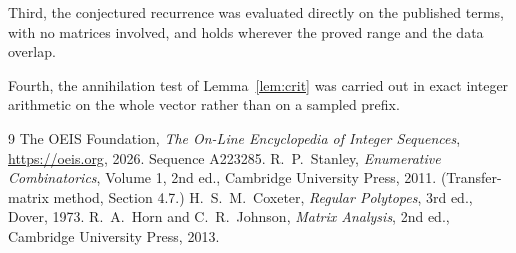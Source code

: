 \documentclass[11pt,a4paper]{article}
\theoremstyle{plain}
\theoremstyle{definition}
\begin{document}
Third, the conjectured recurrence was evaluated directly on the published terms, with no
matrices involved, and holds wherever the proved range and the data overlap.

Fourth, the annihilation test of Lemma~\ref{lem:crit} was carried out in exact integer
arithmetic on the whole vector rather than on a sampled prefix.

\begin{thebibliography}{9}
 The OEIS Foundation, \emph{The On-Line Encyclopedia of Integer
Sequences}, \url{https://oeis.org}, 2026. Sequence A223285.
 R.~P.~Stanley, \emph{Enumerative Combinatorics}, Volume 1, 2nd ed.,
Cambridge University Press, 2011. (Transfer-matrix method, Section 4.7.)
 H.~S.~M.~Coxeter, \emph{Regular Polytopes}, 3rd ed., Dover, 1973.
 R.~A.~Horn and C.~R.~Johnson, \emph{Matrix Analysis}, 2nd ed., Cambridge
University Press, 2013.
\end{thebibliography}
\end{document}
